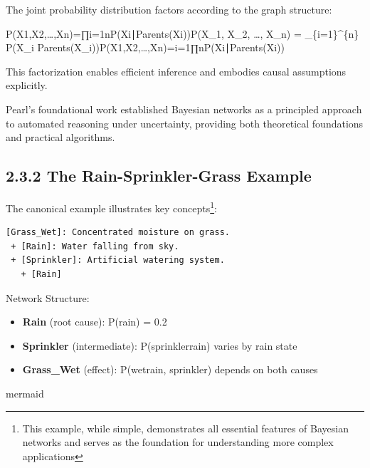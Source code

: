 \documentclass[
  11pt,
  letterpaper,
]{book}
\providecommand{\tightlist}{%
  \setlength{\itemsep}{0pt}\setlength{\parskip}{0pt}}
\begin{document}
The joint probability distribution factors according to the graph
structure:

P(X1,X2,\ldots,Xn)=∏i=1nP(Xi∣Parents(Xi))P(X\_1, X\_2, \ldots, X\_n) =
\prod\_\{i=1\}\^{}\{n\} P(X\_i \textbar{}
Parents(X\_i))P(X1\hspace{0pt},X2\hspace{0pt},\ldots,Xn\hspace{0pt})=i=1∏n\hspace{0pt}P(Xi\hspace{0pt}∣Parents(Xi\hspace{0pt}))

This factorization enables efficient inference and embodies causal
assumptions explicitly.

Pearl's foundational work \textcite{pearl2014} established Bayesian
networks as a principled approach to automated reasoning under
uncertainty, providing both theoretical foundations and practical
algorithms.

\subsection{2.3.2 The Rain-Sprinkler-Grass
Example}\label{the-rain-sprinkler-grass-example}

The canonical example illustrates key concepts\footnote{This example,
  while simple, demonstrates all essential features of Bayesian networks
  and serves as the foundation for understanding more complex
  applications}:

\begin{verbatim}
[Grass_Wet]: Concentrated moisture on grass. 
 + [Rain]: Water falling from sky.
 + [Sprinkler]: Artificial watering system.
   + [Rain]
\end{verbatim}

Network Structure:

\begin{itemize}
\tightlist
\item
  \textbf{Rain} (root cause): P(rain) = 0.2
\item
  \textbf{Sprinkler} (intermediate): P(sprinkler\textbar rain) varies by
  rain state
\item
  \textbf{Grass\_Wet} (effect): P(wet\textbar rain, sprinkler) depends
  on both causes
\end{itemize}

mermaid
\end{document}
